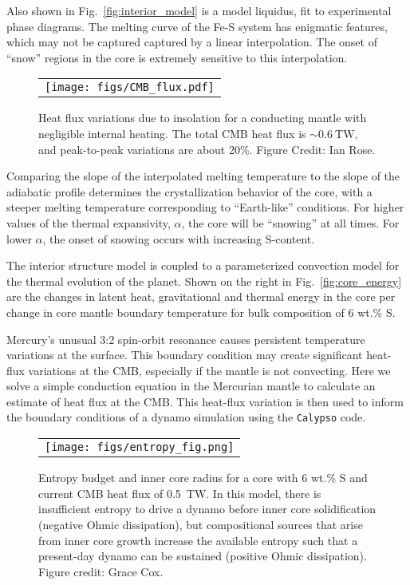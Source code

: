 Also shown in Fig.~\ref{fig:interior_model} is a model liquidus, fit to experimental
phase diagrams. The melting curve of the Fe-S system has enigmatic features, which
may not be captured captured by a  linear interpolation. The onset of ``snow''
regions in the core is extremely sensitive to this interpolation.


 \begin{figure}[h] %
   \centering
\begin{tabular}{c}
 \texttt{[image: figs/CMB\_flux.pdf]} 
\end{tabular}
\caption{ Heat flux variations due to insolation for a conducting mantle with
    negligible internal heating. The total CMB heat flux is $\sim 0.6~\mathrm{TW}$,
and peak-to-peak variations are about 20\%. Figure Credit: Ian Rose.}
\label{fig:flux}
\end{figure}


Comparing the slope of the interpolated melting temperature to the slope of the
adiabatic profile determines the crystallization behavior of the core, with a
steeper melting temperature corresponding to  ``Earth-like'' conditions. For higher
values of the thermal expansivity, $\alpha$, the core will be ``snowing'' at all
times. For lower $\alpha$, the onset of snowing occurs with increasing S-content.



The interior structure model is coupled to a parameterized convection model for
the thermal evolution of the planet. Shown on the right in Fig.~\ref{fig:core_energy}
are the changes in latent heat, gravitational and thermal energy in the core per
change in core mantle boundary temperature for bulk composition of 6 wt.\% S. 



Mercury's unusual 3:2 spin-orbit resonance causes persistent temperature variations
at the surface.  This boundary condition may create significant heat-flux variations
at the CMB, especially if the mantle is not convecting.  Here we solve a simple
conduction equation in the Mercurian mantle to calculate an estimate of heat flux at
the CMB.  This heat-flux variation is then used to inform the boundary conditions of
a dynamo simulation using the \texttt{Calypso} code.

 \begin{figure}[h] %
   \centering
\begin{tabular}{c}
 \texttt{[image: figs/entropy\_fig.png]} 
\end{tabular}
\caption{Entropy budget and inner core radius for a core with 6 wt.\% S and
  current CMB heat flux of 0.5~TW. In this model, there is insufficient entropy to
  drive a dynamo before inner core solidification (negative Ohmic dissipation), but
  compositional sources that arise from inner core growth increase the available
entropy such that a present-day dynamo can be sustained (positive Ohmic dissipation).
Figure credit: Grace Cox. }
\label{entropy}
\end{figure}
